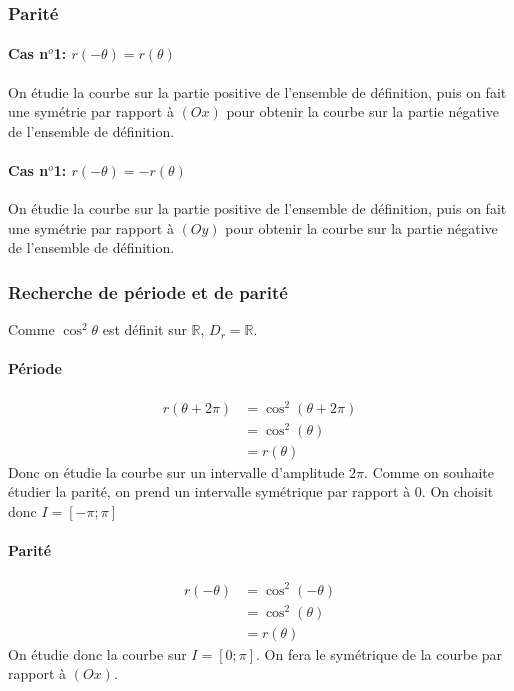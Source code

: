 \documentclass{article}
\begin{document}
\subsubsection{Parité}
\paragraph{Cas n$^o$1: $r(-\theta)=r(\theta)$}
On étudie la courbe sur la partie positive de l'ensemble de définition, puis on fait une symétrie
par rapport à $(Ox)$ pour obtenir la courbe sur la partie négative de l'ensemble de définition.
\paragraph{Cas n$^o$1: $r(-\theta)=-r(\theta)$}
On étudie la courbe sur la partie positive de l'ensemble de définition, puis on fait une symétrie
par rapport à $(Oy)$ pour obtenir la courbe sur la partie négative de l'ensemble de définition.
\subsubsection{Recherche de période et de parité}
Comme $\cos^2 \theta$ est définit sur $\mathbb{R}$, $D_r=\mathbb{R}$.
\paragraph{Période}
\begin{align*}
        r(\theta+2\pi) &= \cos^2(\theta+2\pi)\\
                       &= \cos^2(\theta)     \\
                       &= r(\theta)
\end{align*}
Donc on étudie la courbe sur un intervalle d'amplitude $2\pi$.
Comme on souhaite étudier la parité, on prend un intervalle symétrique par rapport à $0$.
On choisit donc $I=\left[-\pi;\pi\right]$
\paragraph{Parité}
\begin{align*}
        r(-\theta) &= \cos^2(-\theta)\\
                       &= \cos^2(\theta)     \\
                       &= r(\theta)
\end{align*}
On étudie donc la courbe sur $I=\left[0;\pi\right]$.
On fera le symétrique de la courbe par rapport à $(Ox)$.
\end{document}
